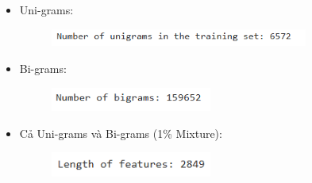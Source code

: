 \begin{itemize}
    \item Uni-grams: 
    \begin{figure}[H]
    \centering
    \includegraphics[width=0.8\textwidth]{img/docspics/Picture5.png}
\end{figure}
    \item Bi-grams:
    \begin{figure}[H]
    \centering
    \includegraphics[width=0.5\textwidth]{img/docspics/Picture6.png}
\end{figure}
    \item Cả Uni-grams và Bi-grams (1\% Mixture):
    \begin{figure}[H]
    \centering
    \includegraphics[width=0.5\textwidth]{img/docspics/Picture7.png}
\end{figure}
    \end{itemize}
    

